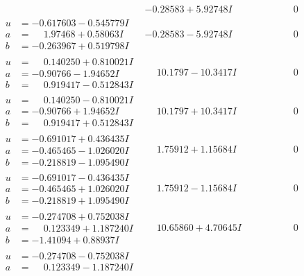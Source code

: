 \documentclass[1p]{elsarticle_modified}
\theoremstyle{definition}
\begin{document}
$$\begin{array}{c|c|c}
 & -0.28583 + 5.92748 I & \phantom{-0.000000 } 0 \\ \hline\begin{aligned}
u &= -0.617603 - 0.545779 I \\
a &= \phantom{-}1.97468 + 0.58063 I \\
b &= -0.263967 + 0.519798 I\end{aligned}
 & -0.28583 - 5.92748 I & \phantom{-0.000000 } 0 \\ \hline\begin{aligned}
u &= \phantom{-}0.140250 + 0.810021 I \\
a &= -0.90766 - 1.94652 I \\
b &= \phantom{-}0.919417 - 0.512843 I\end{aligned}
 & \phantom{-}10.1797 - 10.3417 I & \phantom{-0.000000 } 0 \\ \hline\begin{aligned}
u &= \phantom{-}0.140250 - 0.810021 I \\
a &= -0.90766 + 1.94652 I \\
b &= \phantom{-}0.919417 + 0.512843 I\end{aligned}
 & \phantom{-}10.1797 + 10.3417 I & \phantom{-0.000000 } 0 \\ \hline\begin{aligned}
u &= -0.691017 + 0.436435 I \\
a &= -0.465465 - 1.026020 I \\
b &= -0.218819 - 1.095490 I\end{aligned}
 & \phantom{-}1.75912 + 1.15684 I & \phantom{-0.000000 } 0 \\ \hline\begin{aligned}
u &= -0.691017 - 0.436435 I \\
a &= -0.465465 + 1.026020 I \\
b &= -0.218819 + 1.095490 I\end{aligned}
 & \phantom{-}1.75912 - 1.15684 I & \phantom{-0.000000 } 0 \\ \hline\begin{aligned}
u &= -0.274708 + 0.752038 I \\
a &= \phantom{-}0.123349 + 1.187240 I \\
b &= -1.41094 + 0.88937 I\end{aligned}
 & \phantom{-}10.65860 + 4.70645 I & \phantom{-0.000000 } 0 \\ \hline\begin{aligned}
u &= -0.274708 - 0.752038 I \\
a &= \phantom{-}0.123349 - 1.187240 I \\

\end{aligned}
\end{array}$$
\end{document}
